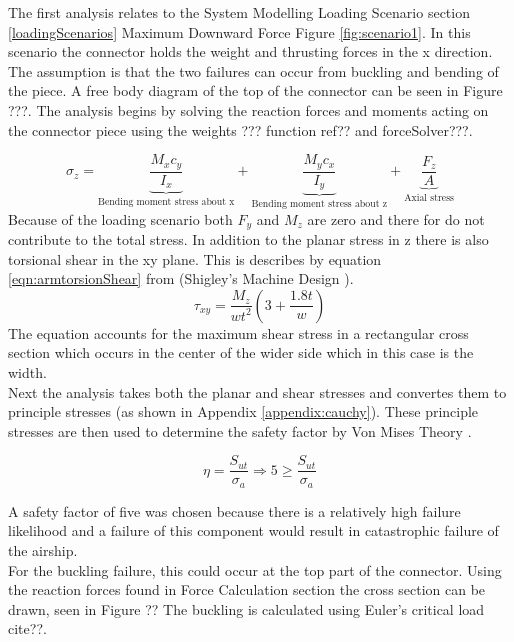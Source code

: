 \documentclass[../main.tex]{subfiles}
\begin{document}
The first analysis relates to the System Modelling Loading Scenario section \ref{loadingScenarios} Maximum Downward Force Figure \ref{fig:scenario1}. In this scenario the connector holds the weight and thrusting forces in the x direction. The assumption is that the two failures can occur from buckling and bending of the piece. A free body diagram of the top of the connector can be seen in Figure ???. The analysis begins by solving the reaction forces and moments acting on the connector piece using the weights ??? function ref?? and forceSolver???. 

\begin{equation}
\label{eqn:connectorztress}
\sigma_{z}=  \underbrace{\frac{M_{x}c_y}{I_x}}_\text{Bending moment stress about x} + \underbrace{\frac{M_{y}c_x}{I_y}}_\text{Bending moment stress about z} + \underbrace{\frac{F_z}{A}}_\text{Axial stress} 
\end{equation}
Because of the loading scenario both $F_y$ and $M_z$ are zero and there for do not contribute to the total stress. In addition to the planar stress in z there is also torsional shear in the xy plane. This is describes by equation \ref{eqn:armtorsionShear} from {(Shigley's Machine Design \cite[102]{shigley})}.
\begin{equation} \label{eqn:armtorsionShear}
\tau_{xy} = \dfrac{M_{z}}{wt^2}(3+\frac{1.8t}{w})
\end{equation}
The equation accounts for the maximum shear stress in a rectangular cross section which occurs in the center of the wider side which in this case is the width. \\ 

Next the analysis takes both the planar and shear stresses and convertes them to principle stresses (as shown in Appendix \ref{appendix:cauchy}). These principle stresses are then used to determine the safety factor by Von Mises Theory \cite[221]{shigley}.

\begin{equation}
\eta = \dfrac{S_{ut}}{\sigma _a} \Rightarrow 5 \geq \dfrac{S_{ut}}{\sigma _a}
\end{equation}

A safety factor of five was chosen because there is a relatively high failure likelihood and a failure of this component would result in catastrophic failure of the airship.\\

For the buckling failure, this could occur at the top part of the connector. Using the reaction forces found in Force Calculation section the cross section can be drawn, seen in Figure ?? The buckling is calculated using Euler's critical load cite??. 
\end{document}

